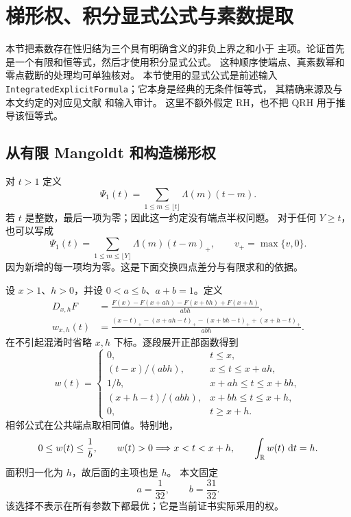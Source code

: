 \section{梯形权、积分显式公式与素数提取}\label{sec:trapezoid}

本节把素数存在性归结为三个具有明确含义的非负上界之和小于
主项。论证首先是一个有限和恒等式，然后才使用积分显式公式。
这种顺序使端点、真素数幂和零点截断的处理均可单独核对。
本节使用的显式公式是前述输入
\texttt{IntegratedExplicitFormula}；它本身是经典的无条件恒等式，
其精确来源及与本文约定的对应见文献 \cite{GM2016} 和输入审计。
这里不额外假定 RH，也不把 QRH 用于推导该恒等式。

\subsection{从有限 Mangoldt 和构造梯形权}

对 $t>1$ 定义
\begin{equation}\label{tr:psi1}
 \Psi_1(t)=\sum_{1\leq m\leq\lfloor t\rfloor}\Lambda(m)(t-m).
\end{equation}
若 $t$ 是整数，最后一项为零；因此这一约定没有端点半权问题。
对于任何 $Y\geq t$，也可以写成
\[
 \Psi_1(t)=
 \sum_{1\leq m\leq\lfloor Y\rfloor}\Lambda(m)(t-m)_+,
 \qquad v_+=\max\{v,0\}.
\]
因为新增的每一项均为零。这是下面交换四点差分与有限求和的依据。

设 $x>1$、$h>0$，并设 $0<a\leq b$、$a+b=1$。定义
\begin{align}
 D_{x,h}F
  &=\frac{F(x)-F(x+ah)-F(x+bh)+F(x+h)}{abh},
       \label{tr:difference}\\
 w_{x,h}(t)
  &=\frac{(x-t)_+-(x+ah-t)_+-(x+bh-t)_++(x+h-t)_+}
          {abh}. \label{tr:weight}
\end{align}
在不引起混淆时省略 $x,h$ 下标。逐段展开正部函数得到
\begin{equation}\label{tr:piecewise}
 w(t)=
 \begin{cases}
 0,&t\leq x,\\
 (t-x)/(abh),&x\leq t\leq x+ah,\\
 1/b,&x+ah\leq t\leq x+bh,\\
 (x+h-t)/(abh),&x+bh\leq t\leq x+h,\\
 0,&t\geq x+h.
 \end{cases}
\end{equation}
相邻公式在公共端点取相同值。特别地，
\begin{equation}\label{tr:weight-properties}
 0\leq w(t)\leq \frac1b,\qquad
 w(t)>0\Longrightarrow x<t<x+h,\qquad
 \int_{\mathbb R}w(t)\,\,\mathrm d t=h.
\end{equation}
面积归一化为 $h$，故后面的主项也是 $h$。
本文固定
\begin{equation}\label{tr:fixed-ab}
 a=\frac1{32},\qquad b=\frac{31}{32}.
\end{equation}
该选择不表示在所有参数下都最优；它是当前证书实际采用的权。

